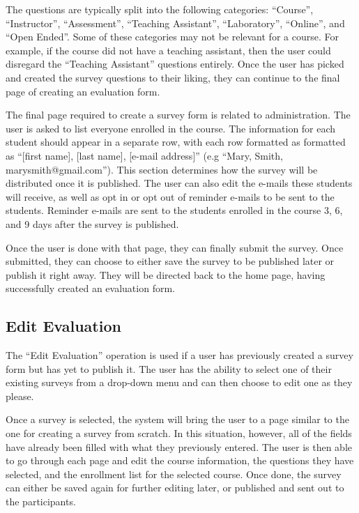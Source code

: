 \documentclass{article}
\begin{document}
The questions are typically split into the following categories: ``Course'', ``Instructor'', ``Assessment'', ``Teaching Assistant'', ``Laboratory'', ``Online'', and ``Open Ended''. Some of these categories may not be relevant for a course. For example, if the course did not have a teaching assistant, then the user could disregard the ``Teaching Assistant'' questions entirely. Once the user has picked and created the survey questions to their liking, they can continue to the final page of creating an evaluation form.

The final page required to create a survey form is related to administration. The user is asked to list everyone enrolled in the course. The information for each student should appear in a separate row, with each row formatted as formatted as ``[first name], [last name], [e-mail address]'' (e.g ``Mary, Smith, marysmith@gmail.com''). This section determines how the survey will be distributed once it is published. The user can also edit the e-mails these students will receive, as well as opt in or opt out of reminder e-mails to be sent to the students. Reminder e-mails are sent to the students enrolled in the course 3, 6, and 9 days after the survey is published.

Once the user is done with that page, they can finally submit the survey. Once submitted, they can choose to either save the survey to be published later or publish it right away. They will be directed back to the home page, having successfully created an evaluation form.

\subsection{Edit Evaluation}

The ``Edit Evaluation'' operation is used if a user has previously created a survey form but has yet to publish it. The user has the ability to select one of their existing surveys from a drop-down menu and can then choose to edit one as they please.

Once a survey is selected, the system will bring the user to a page similar to the one for creating a survey from scratch. In this situation, however, all of the fields have already been filled with what they previously entered. The user is then able to go through each page and edit the course information, the questions they have selected, and the enrollment list for the selected course. Once done, the survey can either be saved again for further editing later, or published and sent out to the participants.
\end{document}
